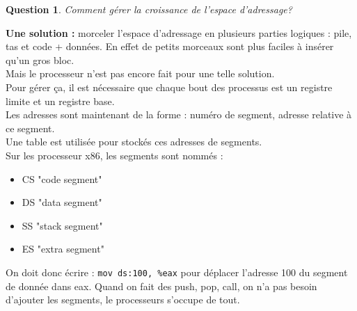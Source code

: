 \documentclass[12pt,a4paper]{report}
\newtheorem*{q}{Question}
\begin{document}
\begin{q}Comment gérer la croissance de l'espace d'adressage?\end{q}
\textbf{Une solution :} morceler l'espace d'adressage en plusieurs parties logiques : pile, tas et code + données. En effet de petits morceaux sont plus faciles à insérer qu'un gros bloc.\\
Mais le processeur n'est pas encore fait pour une telle solution.\\
Pour gérer ça, il est nécessaire que chaque bout des processus est un registre limite et un registre base.\\

Les adresses sont maintenant de la forme : numéro de segment, adresse relative à ce segment.\\
Une table est utilisée pour stockés ces adresses de segments.\\

Sur les processeur x86, les segments sont nommés :
\begin{itemize}
\item CS "code segment"
\item DS "data segment"
\item SS "stack segment"
\item ES "extra segment"
\end{itemize} 

On doit donc écrire : \verb?mov ds:100, %eax? pour déplacer l'adresse 100 du segment de donnée dans eax. Quand on fait des push, pop, call, on n'a pas besoin d'ajouter les segments, le processeurs s'occupe de tout.

\begin{center}
\end{center}
\end{document}
